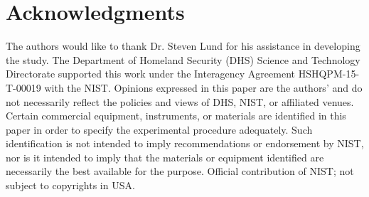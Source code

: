 \documentclass[fleqn,10pt,lineno]{wlpeerj}\usepackage[]{graphicx}\usepackage[]{color}
\begin{document}
\newpage

\section*{Acknowledgments}

The authors would like to thank Dr. Steven Lund for his assistance in developing the study.
The Department of Homeland Security (DHS) Science and Technology Directorate supported this work under the Interagency Agreement HSHQPM-15-T-00019 with the NIST.
Opinions expressed in this paper are the authors’ and do not necessarily reflect the policies and views of DHS,  NIST, or affiliated venues.
Certain commercial equipment, instruments, or materials are identified in this paper in order to specify the experimental procedure adequately.
Such identification is not intended to imply recommendations or endorsement by NIST,
nor is it intended to imply that the materials or equipment identified are necessarily the best available for the purpose.
Official contribution of NIST; not subject to copyrights in USA.


\end{document}
